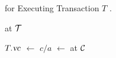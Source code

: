 \setcounter{algorithm}{1}
\begin{algorithm}[H]
  \caption{\rvsimp{} for Executing Transaction $T$ .}
  \begin{algorithmic}[1]
	\State \Return {}  at $\mathcal{T}{}$
		\label{line:rvsimp-client-call-getts}
    \EndProcedure

    	\label{line:rvsimp-call-end}
      \State $T.\textsl{vc}$ $\gets$  \label{line:rvsimp-call-add-vc}
      \State $c/a$ $\gets$   
      at $\mathcal{C}$ \label{line:rvsimp-call-commit}
    \EndProcedure
  \end{algorithmic}
\end{algorithm}
